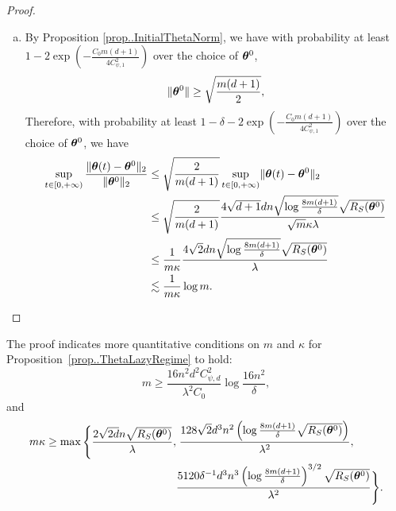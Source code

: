 \documentclass[twoside,11pt]{article}
\begin{document}
\begin{proof}
\begin{enumerate}[(a)]
\begin{enumerate}[(i)]
\begin{equation*}
                        \end{equation*}
                        Suppose that $t^*<+\infty$ then one can take the limit $t\to t^*$ in~\eqref{thm-proof:step1} and~\eqref{thm-proof:step2}. This will lead to a contradiction with the definition of $t^*$. Therefore $t^*=+\infty$.
              \end{enumerate}
        \item By Proposition \ref{prop..InitialThetaNorm}, we have with probability at least $1-2\exp\left(-\frac{C_0m(d+1)}{4C^2_{\psi,1}}\right)$ over the choice of $\bm{\theta}^0$, 
        \begin{equation*}
            \lVert\bm{\theta}^0\rVert\geq \sqrt{\frac{m(d+1)}{2}},
        \end{equation*}
        Therefore, with probability at least $1-\delta-2\exp\left(-\frac{C_0m(d+1)}{4C^2_{\psi,1}}\right)$ over the choice of $\bm{\theta}^0$, we have
              \begin{equation*}
                  \begin{aligned}
                      \sup\limits_{t\in[0,+\infty)}\frac{\lVert\bm{\theta}(t)-\bm{\theta}^0\rVert_2}{\lVert\bm{\theta}^0\rVert_2}
                       & \leq \sqrt{\frac{2}{m(d+1)}}\sup\limits_{t\in[0,+\infty)}\lVert\bm{\theta}(t)-\bm{\theta}^0\rVert_2                                          \\
                       & \leq  \sqrt{\frac{2}{m(d+1)}} \frac{4\sqrt{d+1}dn\sqrt{\log\frac{8m(d+1)}{\delta}}\sqrt{R_S(\bm{\theta}^0)}}{\sqrt{m}\kappa\lambda} \\
                       & \leq \frac{1}{m\kappa}\frac{4\sqrt{2}dn\sqrt{\log\frac{8m(d+1)}{\delta}}\sqrt{R_S(\bm{\theta}^0)}}{\lambda}                         \\
                       & \lesssim \frac{1}{m\kappa}\log m.
                  \end{aligned}
              \end{equation*}
    \end{enumerate}
\end{proof}
\begin{rmk}
    The proof indicates more quantitative conditions on $m$ and $\kappa$ for Proposition~\ref{prop..ThetaLazyRegime} to hold:
    \begin{equation}
        m\geq \frac{16n^2d^2C_{\psi,d}^2}{\lambda^2C_0}\log\frac{16n^2}{\delta},
    \end{equation}
    and
    \begin{equation}
        \begin{aligned}
            m\kappa\geq\max\Bigg\{\frac{2\sqrt{2d}n\sqrt{R_S(\bm{\theta}^0)}}{\lambda}, & \;\frac{128\sqrt{2}d^3n^2\left(\log\frac{8m(d+1)}{\delta}\sqrt{R_S(\bm{\theta}^0)}\right)}{\lambda^2},                \\
                                                                                    & \frac{5120\delta^{-1}d^3n^3\left(\log\frac{8m(d+1)}{\delta}\right)^{3/2}\sqrt{R_S(\bm{\theta}^0)}}{\lambda^2}\Bigg\}.
        \end{aligned}
    \end{equation}
\end{rmk}
\end{document}
